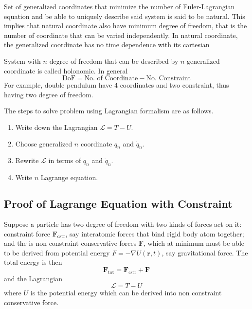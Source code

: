 \documentclass[../../../main.tex]{subfiles}
\begin{document}
Set of generalized coordinates that minimize the number of Euler-Lagrangian equation and be able to uniquely describe said system is said to be natural.
This implies that natural coordinate also have minimum degree of freedom, that is the number of coordinate that can be varied independently.
In natural coordinate, the generalized coordinate has no time dependence with its cartesian 

System with $n$ degree of freedom that can be described by $n$ generalized coordinate is called holonomic.
In general
\begin{equation*}
	\text{DoF}=\text{No. of Coordinate}-\text{No. Constraint}
\end{equation*}
For example, double pendulum have 4 coordinates and two constraint, thus having two degree of freedom.

The steps to solve problem using Lagrangian formalism are as follows.
\begin{enumerate}
	\item Write down the Lagrangian $\mathcal{L}=T-U$.
	\item Choose generalized $n$ coordinate $q_n$ and $\dot{q}_n$.
	\item Rewrite $\mathcal{L}$ in terms of $q_n$ and $\dot{q}_n$.
	\item Write $n$ Lagrange equation.
\end{enumerate}

\subsection*{Proof of Lagrange Equation with Constraint}
Suppose a particle has two degree of freedom with two kinds of forces act on it:
constraint force $\mathbf{F}_\text{cstr}$, say interatomic forces that bind rigid body atom together;
and the is non constraint conservative forces $\mathbf{F}$, which at minimum must be able to be derived from potential energy $F=-\nabla U(\mathbf{r},t)$, say gravitational force.
The total energy is then
\begin{equation*}
	\mathbf{F}_\text{tot}=\mathbf{F}_\text{cstr}+\mathbf{F}
\end{equation*}
and the Lagrangian
\begin{equation*}
	\mathcal{L}=T-U
\end{equation*}
where $U$ is the potential energy which can be derived into non constraint conservative force.
\end{document}
